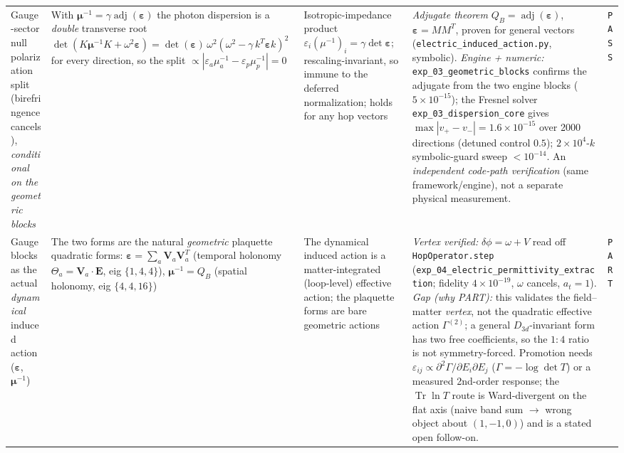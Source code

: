 {\begin{longtable}{@{}p{2.6cm}p{3.8cm}p{3.2cm}p{4.4cm}p{1.0cm}@{}}
Gauge-sector null polarization split (birefringence cancels), \emph{conditional on the geometric blocks}
    & With $\boldsymbol\mu^{-1} = \gamma\operatorname{adj}(\boldsymbol\varepsilon)$ the photon dispersion is a \emph{double} transverse root $\det(K\boldsymbol\mu^{-1}K+\omega^2\boldsymbol\varepsilon) = \det(\boldsymbol\varepsilon)\,\omega^2(\omega^2-\gamma\,k^T\boldsymbol\varepsilon k)^2$ for every direction, so the split $\propto|\varepsilon_a\mu^{-1}_a - \varepsilon_p\mu^{-1}_p| = 0$
    & Isotropic-impedance product $\varepsilon_i(\mu^{-1})_i = \gamma\det\boldsymbol\varepsilon$; rescaling-invariant, so immune to the deferred normalization; holds for any hop vectors
    & \emph{Adjugate theorem} $Q_B = \operatorname{adj}(\boldsymbol\varepsilon)$, $\boldsymbol\varepsilon = MM^T$, proven for general vectors (\texttt{electric\_induced\_action.py}, symbolic). \emph{Engine + numeric:} \texttt{exp\_03\_geometric\_blocks} confirms the adjugate from the two engine blocks ($5\times10^{-15}$); the Fresnel solver \texttt{exp\_03\_dispersion\_core} gives $\max|v_+-v_-| = 1.6\times10^{-15}$ over 2000 directions (detuned control $0.5$); $2\times10^4$-$k$ symbolic-guard sweep $<10^{-14}$. An \emph{independent code-path verification} (same framework/engine), not a separate physical measurement.
    & \texttt{PASS} \\

Gauge blocks as the actual \emph{dynamical} induced action ($\boldsymbol\varepsilon$, $\boldsymbol\mu^{-1}$)
    & The two forms are the natural \emph{geometric} plaquette quadratic forms: $\boldsymbol\varepsilon = \sum_a\mathbf{V}_a\mathbf{V}_a^T$ (temporal holonomy $\Theta_a = \mathbf{V}_a\!\cdot\!\mathbf{E}$, eig $\{1,4,4\}$), $\boldsymbol\mu^{-1} = Q_B$ (spatial holonomy, eig $\{4,4,16\}$)
    & The dynamical induced action is a matter-integrated (loop-level) effective action; the plaquette forms are bare geometric actions
    & \emph{Vertex verified:} $\delta\phi = \omega+V$ read off \texttt{HopOperator.step} (\texttt{exp\_04\_electric\_permittivity\_extraction}; fidelity $4\times10^{-19}$, $\omega$ cancels, $a_t=1$). \emph{Gap (why PART):} this validates the field--matter \emph{vertex}, not the quadratic effective action $\Gamma^{(2)}$; a general $D_{3d}$-invariant form has two free coefficients, so the $1{:}4$ ratio is not symmetry-forced. Promotion needs $\varepsilon_{ij}\propto\partial^2\Gamma/\partial E_i\partial E_j$ ($\Gamma=-\log\det T$) or a measured 2nd-order response; the $\operatorname{Tr}\ln T$ route is Ward-divergent on the flat axis (naive band sum $\to$ wrong object about $(1,-1,0)$) and is a stated open follow-on.
    & \texttt{PART} \\


\end{longtable}}
